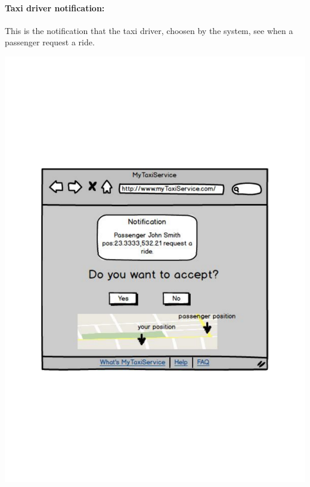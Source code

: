 \paragraph{Taxi driver notification:}
This is the notification that the taxi driver, choosen by the system, see when a passenger request a ride.
\begin{center}
	\includegraphics[width=\textwidth]{mockup/taxiDriverNotification.pdf}
\end{center}
